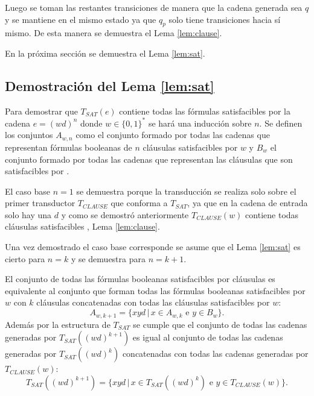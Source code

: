 \documentclass[12pt]{article}
\begin{document}
Luego se toman las restantes transiciones de manera que la cadena generada sea $q$ y se mantiene en el mismo estado ya que $q_p$ solo tiene transiciones hacia sí mismo. De esta manera se demuestra el Lema \ref{lem:clause}. 

En la próxima sección se demuestra el Lema \ref{lem:sat}.

\subsection{Demostración del Lema \ref{lem:sat}}

Para demostrar que $T_{SAT}(e)$ contiene todas las fórmulas satisfacibles por la cadena $e=(wd)^n$
donde $w\in\{0,1\}^*$ se hará una inducción sobre $n$. Se definen los conjuntos $A_{w,n}$ como el 
conjunto formado por todas las cadenas que representan fórmulas booleanas de $n$ cláusulas satisfacibles 
por $w$ y $B_w$ el conjunto formado por todas las cadenas que representan las cláusulas que son satisfacibles 
por . 

El caso base $n=1$ se demuestra porque la transducción se realiza solo sobre el primer transductor $T_{CLAUSE}$
que conforma a $T_{SAT}$, ya que en la cadena de entrada solo hay una $d$ y como se demostró anteriormente $T_{CLAUSE}(w)$ contiene todas cláusulas satisfacibles
, Lema \ref{lem:clause}. 

Una vez demostrado el caso base corresponde se asume que el Lema \ref{lem:sat} es cierto para $n=k$ y se demuestra para $n=k+1$. 

El conjunto de todas las fórmulas booleanas satisfacibles por  cláusulas es equivalente al conjunto que forman todas las fórmulas booleanas satisfacibles por $w$ con $k$ cláusulas concatenadas con todas las cláusulas satisfacibles por $w$:
$$A_{w,k+1}=\{xyd\,|\,x\in A_{w,k} \text{ e } y\in B_w\}.$$
Además por la estructura de $T_{SAT}$ se cumple que el conjunto de todas las cadenas
generadas por $T_{SAT}((wd)^{k+1})$ es igual al conjunto de todas las cadenas 
generadas por $T_{SAT}((wd)^{k})$ concatenadas con todas las cadenas generadas por $T_{CLAUSE}(w)$:  
$$T_{SAT}((wd)^{k+1})=\{xyd\,|\,x\in T_{SAT}((wd)^{k}) \text{ e } y\in T_{CLAUSE}(w)\}.$$
\end{document}
